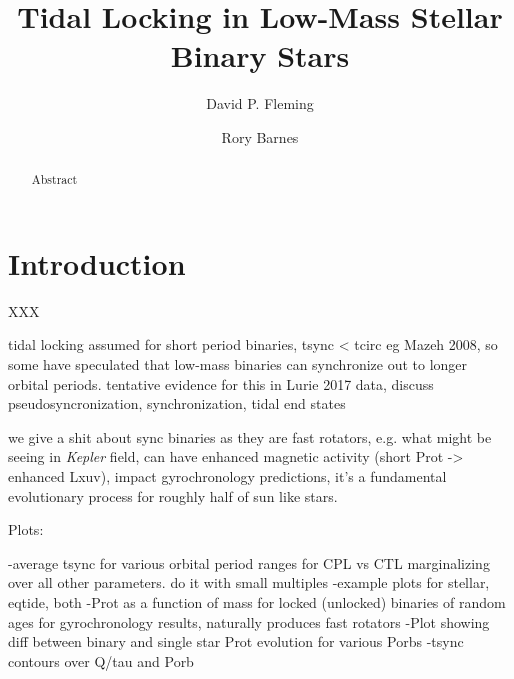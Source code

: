 \documentclass[twocolumn]{aastex61}
\newcommand{\kepler}[0]{\textit{Kepler}\xspace}
\begin{document}
\title{Tidal Locking in Low-Mass Stellar Binary Stars}



\author{David P. Fleming}

\author{Rory Barnes}


\begin{abstract}

Abstract

\end{abstract}




\section{Introduction} \label{sec:intro}

XXX

tidal locking assumed for short period binaries, tsync < tcirc eg Mazeh 2008, so some have speculated that low-mass binaries can synchronize out to longer orbital periods.  tentative evidence for this in Lurie 2017 data, discuss pseudosyncronization, synchronization, \citet{Counselman1973} tidal end states

we give a shit about sync binaries as they are fast rotators, e.g. what \citet{Simonian2018} might be seeing in \kepler field, can have enhanced magnetic activity (short Prot -> enhanced Lxuv), impact gyrochronology predictions, it's a fundamental evolutionary process for roughly half of sun like stars.

Plots:

-average tsync for various orbital period ranges for CPL vs CTL marginalizing over all other parameters. do it with small multiples
-example plots for stellar, eqtide, both
-Prot as a function of mass for locked (unlocked) binaries of random ages for gyrochronology results, naturally produces fast rotators
-Plot showing diff between binary and single star Prot evolution for various Porbs
-tsync contours over Q/tau and Porb
\end{document}
